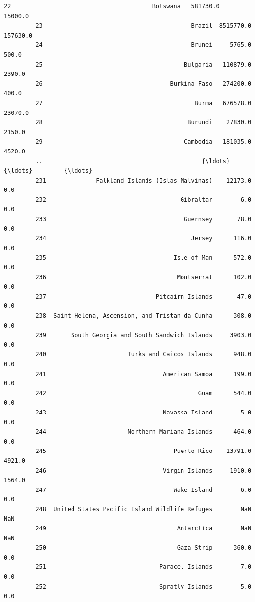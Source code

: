 \documentclass[11pt]{article}
\begin{document}
\begin{Verbatim}[commandchars=\\\{\}]
         22                                        Botswana   581730.0     15000.0   
         23                                          Brazil  8515770.0    157630.0   
         24                                          Brunei     5765.0       500.0   
         25                                        Bulgaria   110879.0      2390.0   
         26                                    Burkina Faso   274200.0       400.0   
         27                                           Burma   676578.0     23070.0   
         28                                         Burundi    27830.0      2150.0   
         29                                        Cambodia   181035.0      4520.0   
         ..                                             {\ldots}        {\ldots}         {\ldots}   
         231              Falkland Islands (Islas Malvinas)    12173.0         0.0   
         232                                      Gibraltar        6.0         0.0   
         233                                       Guernsey       78.0         0.0   
         234                                         Jersey      116.0         0.0   
         235                                    Isle of Man      572.0         0.0   
         236                                     Montserrat      102.0         0.0   
         237                               Pitcairn Islands       47.0         0.0   
         238  Saint Helena, Ascension, and Tristan da Cunha      308.0         0.0   
         239       South Georgia and South Sandwich Islands     3903.0         0.0   
         240                       Turks and Caicos Islands      948.0         0.0   
         241                                 American Samoa      199.0         0.0   
         242                                           Guam      544.0         0.0   
         243                                 Navassa Island        5.0         0.0   
         244                       Northern Mariana Islands      464.0         0.0   
         245                                    Puerto Rico    13791.0      4921.0   
         246                                 Virgin Islands     1910.0      1564.0   
         247                                    Wake Island        6.0         0.0   
         248  United States Pacific Island Wildlife Refuges        NaN         NaN   
         249                                     Antarctica        NaN         NaN   
         250                                     Gaza Strip      360.0         0.0   
         251                                Paracel Islands        7.0         0.0   
         252                                Spratly Islands        5.0         0.0   

\end{Verbatim}
\end{document}
